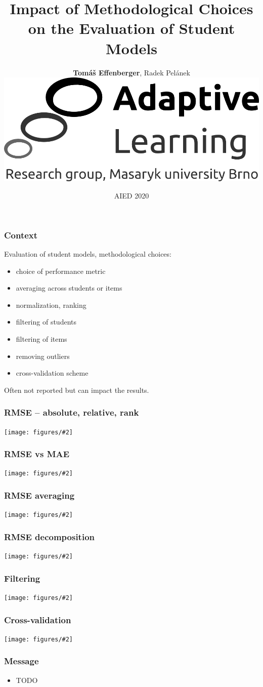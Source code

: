 \documentclass[bigger]{beamer}
\title{Impact of Methodological Choices\\on the Evaluation of Student Models}
\author{\textbf{Tom\'a\v{s} Effenberger}, Radek Pel\'anek\\[4mm]
\includegraphics[width=.35\linewidth]{figures/al-logo}\\[4mm]
}
\date{AIED 2020}
\newcommand{\img}[2]{
  \begin{center}
    \texttt{[image: figures/\#2]}
  \end{center}
}
\begin{document}
\frame{\titlepage}

\begin{frame}
  \frametitle{Context}
  Evaluation of student models, methodological choices:
  \begin{itemize}
    \item choice of performance metric
    \item averaging across students or items
    \item normalization, ranking
    \item filtering of students
    \item filtering of items
    \item removing outliers %
    \item cross-validation scheme  %
  \end{itemize}

  Often not reported but can impact the results.

\end{frame}


\begin{frame}
  \frametitle{RMSE -- absolute, relative, rank}
  \img{1.0}{RMSE-abs-rel-rank}
\end{frame}


\begin{frame}
  \frametitle{RMSE vs MAE}
  \img{1.0}{RMSE-vs-MAE}
\end{frame}

\begin{frame}
  \frametitle{RMSE averaging}
  \img{1.0}{RMSE-averaging--Robot}
\end{frame}

\begin{frame}
  \frametitle{RMSE decomposition}
  \img{1.0}{RMSE-rank-per-level--Robot}
\end{frame}

\begin{frame}
  \frametitle{Filtering}
  \img{1.0}{students-min-attempts--Robot}
\end{frame}

\begin{frame}
  \frametitle{Cross-validation}
  \img{1.0}{cv--turtle}
\end{frame}


\begin{frame}
  \frametitle{Message}
  \begin{itemize}
    \item TODO
  \end{itemize}
\end{frame}
\end{document}
